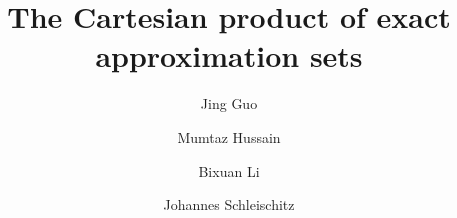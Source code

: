 \documentclass[11pt]{amsart}
\numberwithin{equation}{section}
\newcommand{\0}{\mathbf{0}}
\theoremstyle{remark}
\begin{document}
\title{The Cartesian product of exact approximation sets}%

\author{Jing Guo}
\address{Jing Guo, School of Mathematics and Statistics, Huazhong University of Science and Technology, Wuhan 430074, P. R. China}

\author[Mumtaz Hussain]{Mumtaz Hussain}
\address{Mumtaz Hussain, Department of Mathematical and Physical Sciences,  La Trobe University, Bendigo 3552, Australia. }

\author{Bixuan Li}
\address{Bixuan Li, Institute of Mathematics, Academy of Mathematics and System Science, CAS, Zhongguancun East Road 55, Beijing 100190, P. R. China}

\author[Johannes Schleischitz]{Johannes Schleischitz}
\address{Johannes Schleischitz, School of Computer, Data, and Mathematical Sciences, Western Sydney University, NSW, Australia}


\date{}
\end{document}
